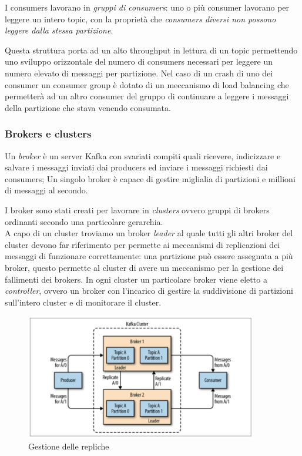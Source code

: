 \documentclass[]{article}
\begin{document}
\newpage

I consumers lavorano in \emph{gruppi di consumers}: uno o più consumer
lavorano per leggere un intero topic, con la proprietà che
\emph{consumers diversi non possono leggere dalla stessa partizione}.

Questa struttura porta ad un alto throughput in lettura di un topic
permettendo uno sviluppo orizzontale del numero di consumers necessari
per leggere un numero elevato di messaggi per partizione. Nel caso di un
crash di uno dei consumer un consumer group è dotato di un meccanismo di
load balancing che permetterà ad un altro consumer del gruppo di
continuare a leggere i messaggi della partizione che stava venendo
consumata.

\subsubsection{Brokers e clusters}\label{brokers-e-clusters}

Un \emph{broker} è un server Kafka con svariati compiti quali ricevere,
indicizzare e salvare i messaggi inviati dai producers ed inviare i
messaggi richiesti dai consumers; Un singolo broker è capace di gestire
miglialia di partizioni e millioni di messaggi al secondo.

I broker sono stati creati per lavorare in \emph{clusters} ovvero gruppi
di brokers ordinanti secondo una particolare gerarchia.\\
A capo di un cluster troviamo un broker \emph{leader} al quale tutti gli
altri broker del cluster devono far riferimento per permette ai
meccanismi di replicazioni dei messaggi di funzionare correttamente: una
partizione può essere assegnata a più broker, questo permette al cluster
di avere un meccanismo per la gestione dei fallimenti dei brokers. In
ogni cluster un particolare broker viene eletto a \emph{controller},
ovvero un broker con l'incarico di gestire la suddivisione di partizioni
sull'intero cluster e di monitorare il cluster.

\begin{figure}
\centering
\includegraphics[width=0.90000\textwidth]{../images/partition-replica.png}
\caption{Gestione delle repliche \label{figure_4}}
\end{figure}
\end{document}
